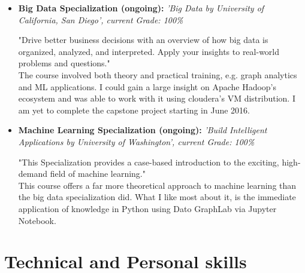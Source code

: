 \documentclass[11pt,a4paper,sans]{moderncv}        %
\begin{document}
\begin{itemize}

\item{\textbf{Big Data Specialization (ongoing):} \textit{'Big Data by University of California, San Diego', current Grade: 100\%}

\vspace{2pt}

\small{"Drive better business decisions with an overview of how big data is organized, analyzed, and interpreted. Apply your insights to real-world problems and questions."\\
The course involved both theory and practical training, e.g. graph analytics and ML applications. I could gain a large insight on Apache Hadoop's ecosystem
and was able to work with it using cloudera's VM distribution. I am yet to complete the capstone project starting in June 2016.}}

\item{\textbf{Machine Learning Specialization (ongoing):} \textit{'Build Intelligent Applications by University of Washington', current Grade: 100\%}

\vspace{2pt}

\small{"This Specialization provides a case-based introduction to the exciting, high-demand field of machine learning."\\
This course offers a far more theoretical approach to machine learning than the big data specialization did. What I like most about it, is the immediate 
application of knowledge in Python using Dato GraphLab via Jupyter Notebook.}}

\end{itemize}

\section{Technical and Personal skills}

\vspace{6pt}
\end{document}
